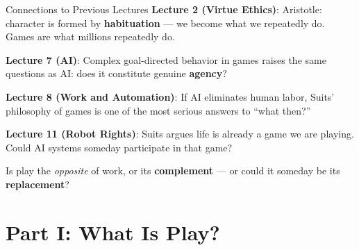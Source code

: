 \documentclass[aspectratio=169,11pt]{beamer}
\begin{document}
\begin{frame}{Connections to Previous Lectures}
\footnotesize
\textbf{Lecture 2 (Virtue Ethics)}: Aristotle: character is formed by \textbf{habituation} --- we become what we repeatedly do. Games are what millions repeatedly do.

\vspace{0.12cm}
\textbf{Lecture 7 (AI)}: Complex goal-directed behavior in games raises the same questions as AI: does it constitute genuine \textbf{agency}?

\vspace{0.12cm}
\textbf{Lecture 8 (Work and Automation)}: If AI eliminates human labor, Suits' philosophy of games is one of the most serious answers to ``what then?''

\vspace{0.12cm}
\textbf{Lecture 11 (Robot Rights)}: Suits argues life is already a game we are playing. Could AI systems someday participate in that game?

\begin{discussionbox}[Discussion]
Is play the \emph{opposite} of work, or its \textbf{complement} --- or could it someday be its \textbf{replacement}?
\end{discussionbox}
\end{frame}

\section{Part I: What Is Play?}
\end{document}
